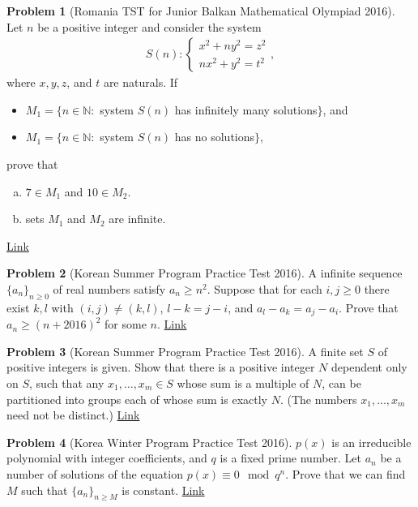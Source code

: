 \documentclass[]{article}
\theoremstyle{definition}
\newtheorem{problem}{Problem}
\begin{document}
\begin{problem}[Romania TST for Junior Balkan Mathematical Olympiad 2016]
	Let $n$ be a positive integer and consider the system
		\begin{align*}
			S(n):\begin{cases}
				x^2+ny^2=z^2\\
				nx^2+y^2=t^2
			\end{cases},
		\end{align*}
	where $x,y,z$, and $t$ are naturals. If
		\begin{itemize}
			\item $M_1=\{n\in\mathbb N:$ system $S(n)$ has infinitely many solutions$\}$, and
			\item $M_1=\{n\in\mathbb N:$ system $S(n)$ has no solutions$\}$,
		\end{itemize}
	prove that
		\begin{enumerate}[(a)]
			\item $7 \in M_1$ and $10 \in M_2$.
			\item sets $M_1$ and $M_2$ are infinite.
		\end{enumerate} 
	\hfill \href{http://artofproblemsolving.com/community/c6h1257390p6509523}{Link}
\end{problem}




\begin{problem}[Korean Summer Program Practice Test 2016]
	A infinite sequence $\{ a_n \}_{n \ge 0}$ of real numbers satisfy $a_n \ge n^2$. Suppose that for each $i, j \ge 0$ there exist $k, l$ with $(i,j) \neq (k,l)$, $l - k = j - i$, and $a_l - a_k = a_j - a_i$. Prove that $a_n \ge (n + 2016)^2$ for some $n$. \hfill \href{http://artofproblemsolving.com/community/c6h1291457p6833569}{Link}
\end{problem}



\begin{problem}[Korean Summer Program Practice Test 2016]
	A finite set $S$ of positive integers is given. Show that there is a positive integer $N$ dependent only on $S$, such that any $x_1, \dots, x_m \in S$ whose sum is a multiple of $N$, can be partitioned into groups each of whose sum is exactly $N$. (The numbers $x_1, \dots, x_m$ need not be distinct.) \hfill \href{http://artofproblemsolving.com/community/c6h1291452p6833555}{Link}
\end{problem}



\begin{problem}[Korea Winter Program Practice Test 2016]
	$p(x)$ is an irreducible polynomial with integer coefficients, and $q$ is a fixed prime number. Let $a_n$ be a number of solutions of the equation $p(x)\equiv 0\mod q^n$. Prove that we can find $M$ such that $\{a_n\}_{n\ge M}$ is constant. \hfill \href{http://artofproblemsolving.com/community/c6h1190175p5802127}{Link}
\end{problem}
\end{document}

